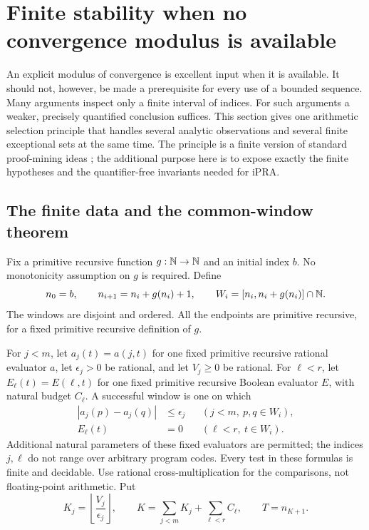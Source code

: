 \section{Finite stability when no convergence modulus is available}
\label{sec:stability}

An explicit modulus of convergence is excellent input when it is available.
It should not, however, be made a prerequisite for every use of a bounded
sequence. Many arguments inspect only a finite interval of indices. For
such arguments a weaker, precisely quantified conclusion suffices. This
section gives one arithmetic selection principle that handles several
analytic observations and several finite exceptional sets at the same
time. The principle is a finite version of standard proof-mining ideas
\cite{ProofMining}; the additional purpose here is to expose exactly the
finite hypotheses and the quantifier-free invariants needed for iPRA.

\subsection{The finite data and the common-window theorem}

Fix a primitive recursive function $g:\mathbb N\to\mathbb N$ and an initial index $b$.
No monotonicity assumption on $g$ is required. Define
\begin{equation}\label{eq:endpoints}
 n_0=b,\qquad n_{i+1}=n_i+g(n_i)+1,
 \qquad W_i=[n_i,n_i+g(n_i)]\cap\mathbb N.
\end{equation}
The windows are disjoint and ordered. All the endpoints are primitive
recursive, for a fixed primitive recursive definition of $g$.

For $j<m$, let $a_j(t)=a(j,t)$ for one fixed primitive recursive rational
evaluator $a$, let
$\epsilon_j>0$ be rational, and let $V_j\geq0$ be rational. For $\ell<r$,
let $E_\ell(t)=E(\ell,t)$ for one fixed primitive recursive Boolean
evaluator $E$, with natural
budget $C_\ell$. A successful window is one on which
\begin{align}
 |a_j(p)-a_j(q)|&\leq\epsilon_j
   &&(j<m,\ p,q\in W_i),\label{eq:stable-window}\\
 E_\ell(t)&=0 &&(\ell<r,\ t\in W_i).\label{eq:empty-window}
\end{align}
Additional natural parameters of these fixed evaluators are permitted;
the indices $j,\ell$ do not range over arbitrary program codes.
Every test in these formulas is finite and decidable. Use rational
cross-multiplication for the comparisons, not floating-point arithmetic.
Put
\begin{equation}\label{eq:stability-budget}
 K_j=\left\lfloor\frac{V_j}{\epsilon_j}\right\rfloor,
 \qquad K=\sum_{j<m}K_j+\sum_{\ell<r} C_\ell,
 \qquad T=n_{K+1}.
\end{equation}

